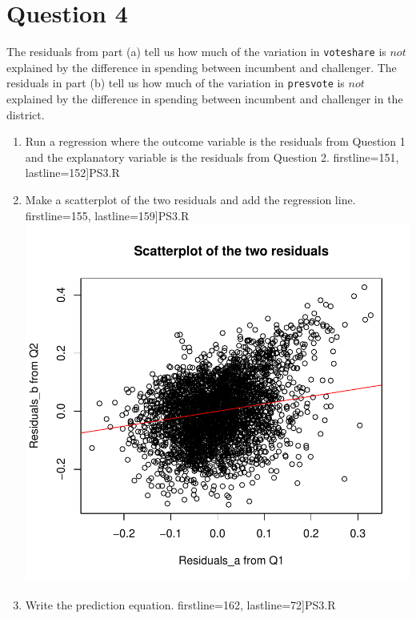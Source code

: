 \documentclass[12pt,letterpaper]{article}
\begin{document}
\section*{Question 4}
\noindent The residuals from part (a) tell us how much of the variation in \texttt{voteshare} is $not$ explained by the difference in spending between incumbent and challenger. The residuals in part (b) tell us how much of the variation in \texttt{presvote} is $not$ explained by the difference in spending between incumbent and challenger in the district.
	\begin{enumerate}
		\item Run a regression where the outcome variable is the residuals from Question 1 and the explanatory variable is the residuals from Question 2.	\vspace{0.2cm}
		 firstline=151, lastline=152]{PS3.R}
		\item Make a scatterplot of the two residuals and add the regression line. 	\vspace{0.2cm}
		 firstline=155, lastline=159]{PS3.R} 
		\noindent\includegraphics[width=.75\textwidth]{scatterplot4.pdf}
		\label{fig:scatterplot_4}
		\item Write the prediction equation.
		 firstline=162, lastline=72]{PS3.R} 
	\end{enumerate}
	
\end{document}
